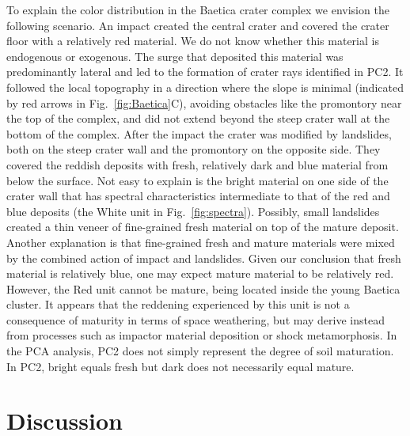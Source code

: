 \documentclass[3p,authoryear]{elsarticle}
\begin{document}
To explain the color distribution in the Baetica crater complex we envision the following scenario. An impact created the central crater and covered the crater floor with a relatively red material. We do not know whether this material is endogenous or exogenous. The surge that deposited this material was predominantly lateral and led to the formation of crater rays identified in PC2. It followed the local topography in a direction where the slope is minimal (indicated by red arrows in Fig.~\ref{fig:Baetica}C), avoiding obstacles like the promontory near the top of the complex, and did not extend beyond the steep crater wall at the bottom of the complex. After the impact the crater was modified by landslides, both on the steep crater wall and the promontory on the opposite side. They covered the reddish deposits with fresh, relatively dark and blue material from below the surface. Not easy to explain is the bright material on one side of the crater wall that has spectral characteristics intermediate to that of the red and blue deposits (the White unit in Fig.~\ref{fig:spectra}). Possibly, small landslides created a thin veneer of fine-grained fresh material on top of the mature deposit. Another explanation is that fine-grained fresh and mature materials were mixed by the combined action of impact and landslides. Given our conclusion that fresh material is relatively blue, one may expect mature material to be relatively red. However, the Red unit cannot be mature, being located inside the young Baetica cluster. It appears that the reddening experienced by this unit is not a consequence of maturity in terms of space weathering, but may derive instead from processes such as impactor material deposition or shock metamorphosis. In the PCA analysis, PC2 does not simply represent the degree of soil maturation. In PC2, bright equals fresh but dark does not necessarily equal mature.


\section{Discussion}
\label{sec:discussion}
\end{document}
